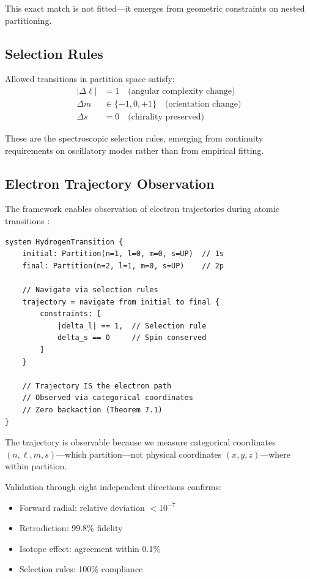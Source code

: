 \documentclass[twocolumn,10pt]{article}
\theoremstyle{remark}
\begin{document}
This exact match is not fitted---it emerges from geometric constraints on nested partitioning.

\subsection{Selection Rules}

Allowed transitions in partition space satisfy:
\begin{align}
|\Delta \ell| &= 1 \quad \text{(angular complexity change)} \\
\Delta m &\in \{-1, 0, +1\} \quad \text{(orientation change)} \\
\Delta s &= 0 \quad \text{(chirality preserved)}
\end{align}

These are the spectroscopic selection rules, emerging from continuity requirements on oscillatory modes rather than from empirical fitting.

\subsection{Electron Trajectory Observation}

The framework enables observation of electron trajectories during atomic transitions \cite{sachikonye2024light}:

\begin{lstlisting}
system HydrogenTransition {
    initial: Partition(n=1, l=0, m=0, s=UP)  // 1s
    final: Partition(n=2, l=1, m=0, s=UP)    // 2p

    // Navigate via selection rules
    trajectory = navigate from initial to final {
        constraints: [
            |delta_l| == 1,  // Selection rule
            delta_s == 0     // Spin conserved
        ]
    }

    // Trajectory IS the electron path
    // Observed via categorical coordinates
    // Zero backaction (Theorem 7.1)
}
\end{lstlisting}

The trajectory is observable because we measure categorical coordinates $(n, \ell, m, s)$---which partition---not physical coordinates $(x, y, z)$---where within partition.

Validation through eight independent directions confirms:
\begin{itemize}
    \item Forward radial: relative deviation $< 10^{-7}$
    \item Retrodiction: 99.8\% fidelity
    \item Isotope effect: agreement within 0.1\%
    \item Selection rules: 100\% compliance
\end{itemize}
\end{document}
